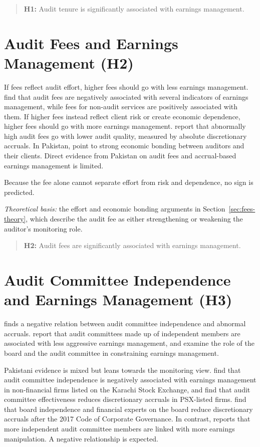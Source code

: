 \begin{quote}
  \textbf{H1:} Audit tenure is significantly associated with earnings management.
\end{quote}

\section{Audit Fees and Earnings Management (H2)}

If fees reflect audit effort, higher fees should go with less earnings management. \textcite{frankel2002} find that audit fees are negatively associated with several indicators of earnings management, while fees for non-audit services are positively associated with them. If higher fees instead reflect client risk or create economic dependence, higher fees should go with more earnings management. \textcite{choi2010} report that abnormally high audit fees go with lower audit quality, measured by absolute discretionary accruals. In Pakistan, \textcite{abid2018} point to strong economic bonding between auditors and their clients. Direct evidence from Pakistan on audit fees and accrual-based earnings management is limited.

Because the fee alone cannot separate effort from risk and dependence, no sign is predicted.

\emph{Theoretical basis:} the effort and economic bonding arguments in Section~\ref{sec:fees-theory}, which describe the audit fee as either strengthening or weakening the auditor's monitoring role.

\begin{quote}
  \textbf{H2:} Audit fees are significantly associated with earnings management.
\end{quote}

\section{Audit Committee Independence and Earnings Management (H3)}

\textcite{klein2002} finds a negative relation between audit committee independence and abnormal accruals. \textcite{bedard2004} report that audit committees made up of independent members are associated with less aggressive earnings management, and \textcite{xie2003} examine the role of the board and the audit committee in constraining earnings management.

Pakistani evidence is mixed but leans towards the monitoring view. \textcite{latif2015} find that audit committee independence is negatively associated with earnings management in non-financial firms listed on the Karachi Stock Exchange, and \textcite{khan2020} find that audit committee effectiveness reduces discretionary accruals in PSX-listed firms. \textcite{khan2024} find that board independence and financial experts on the board reduce discretionary accruals after the 2017 Code of Corporate Governance. In contrast, \textcite{mumtaz2018} reports that more independent audit committee members are linked with more earnings manipulation. A negative relationship is expected.

